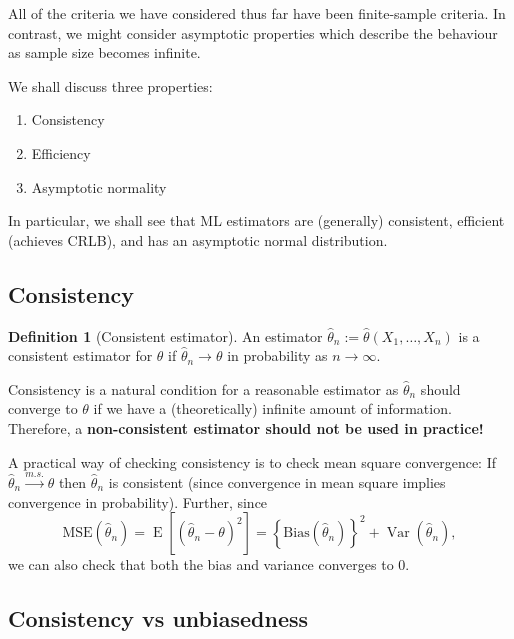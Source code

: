 \documentclass[
]{book}
\providecommand{\tightlist}{%
  \setlength{\itemsep}{0pt}\setlength{\parskip}{0pt}}
\DeclareMathOperator{\E}{E}
\DeclareMathOperator{\Var}{Var}
\theoremstyle{definition}
\newtheorem{definition}{Definition}[chapter]
\theoremstyle{definition}
\theoremstyle{definition}
\theoremstyle{definition}
\theoremstyle{remark}
\begin{document}
All of the criteria we have considered thus far have been finite-sample criteria.
In contrast, we might consider asymptotic properties which describe the behaviour as sample size becomes infinite.

We shall discuss three properties:

\begin{enumerate}
\def\labelenumi{\arabic{enumi}.}
\tightlist
\item
  Consistency
\item
  Efficiency
\item
  Asymptotic normality
\end{enumerate}

In particular, we shall see that ML estimators are (generally) consistent, efficient (achieves CRLB), and has an asymptotic normal distribution.

\hypertarget{consistency}{%
\subsection{Consistency}\label{consistency}}

\begin{definition}[Consistent estimator]
An estimator \(\hat\theta_n := \hat\theta(X_1,\dots,X_n)\) is a consistent estimator for \(\theta\) if \(\hat\theta_n \to \theta\) in probability as \(n\to\infty\).
\end{definition}

Consistency is a natural condition for a reasonable estimator as
\(\hat\theta_n\) should converge to \(\theta\) if we have a (theoretically)
infinite amount of information. Therefore, a \textbf{non-consistent estimator
should not be used in practice!}

A practical way of checking consistency is to check mean square convergence: If \(\hat\theta_n \xrightarrow{m.s.} \theta\) then \(\hat\theta_n\) is consistent (since convergence in mean square implies convergence in probability). Further, since
\[
\text{MSE}(\hat\theta_n) = \E\left[(\hat\theta_n-\theta)^2 \right] = \left\{\text{Bias}(\hat\theta_n)\right\}^2 + \Var(\hat\theta_n), 
\]
we can also check that both the bias and variance converges to 0.

\hypertarget{consistency-vs-unbiasedness}{%
\subsection{Consistency vs unbiasedness}\label{consistency-vs-unbiasedness}}
\end{document}
